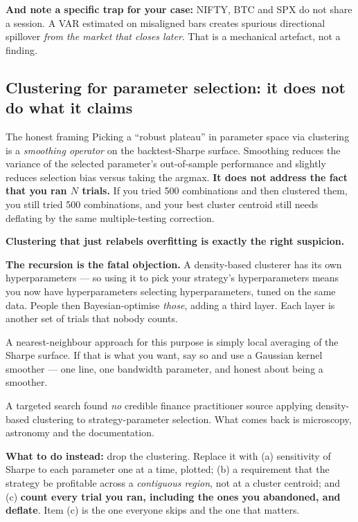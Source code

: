 \documentclass[11pt,a4paper]{article}
\newcommand{\srcnote}[1]{{\footnotesize\color{soft}#1\par}}
\begin{document}
\textbf{And note a specific trap for your case:} NIFTY, BTC and SPX do not share a
session. A VAR estimated on misaligned bars creates spurious directional spillover
\emph{from the market that closes later}. That is a mechanical artefact, not a finding.

\subsection{Clustering for parameter selection: it does not do what it claims}

\begin{keyfact}{The honest framing}
Picking a ``robust plateau'' in parameter space via clustering is a \emph{smoothing
operator} on the backtest-Sharpe surface. Smoothing reduces the variance of the
selected parameter's out-of-sample performance and slightly reduces selection bias
versus taking the argmax. \textbf{It does not address the fact that you ran $N$
trials.} If you tried 500 combinations and then clustered them, you still tried 500
combinations, and your best cluster centroid still needs deflating by the same
multiple-testing correction.

\textbf{Clustering that just relabels overfitting is exactly the right suspicion.}
\end{keyfact}

\textbf{The recursion is the fatal objection.} A density-based clusterer has its
own hyperparameters --- so using it to pick your strategy's hyperparameters means
you now have hyperparameters selecting hyperparameters, tuned on the same data.
People then Bayesian-optimise \emph{those}, adding a third layer. Each layer is
another set of trials that nobody counts.

A nearest-neighbour approach for this purpose is simply local averaging of the
Sharpe surface. If that is what you want, say so and use a Gaussian kernel smoother
--- one line, one bandwidth parameter, and honest about being a smoother.

\srcnote{A targeted search found \emph{no} credible finance practitioner source
applying density-based clustering to strategy-parameter selection. What comes back
is microscopy, astronomy and the documentation.}

\textbf{What to do instead:} drop the clustering. Replace it with (a) sensitivity
of Sharpe to each parameter one at a time, plotted; (b) a requirement that the
strategy be profitable across a \emph{contiguous region}, not at a cluster
centroid; and (c) \textbf{count every trial you ran, including the ones you
abandoned, and deflate}. Item (c) is the one everyone skips and the one that matters.
\end{document}
